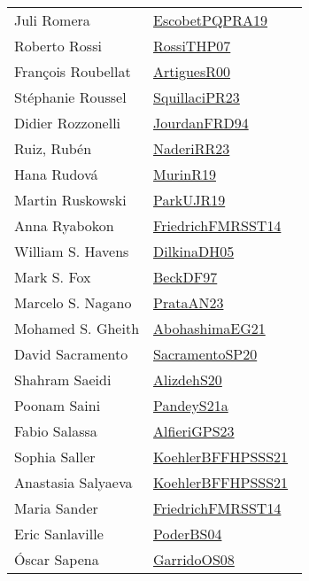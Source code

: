 {\begin{longtable}{p{4cm}p{20cm}}
Juli Romera & \href{works/EscobetPQPRA19.pdf}{EscobetPQPRA19}~\cite{EscobetPQPRA19}\\
Roberto Rossi & \href{works/RossiTHP07.pdf}{RossiTHP07}~\cite{RossiTHP07}\\
Fran{\c{c}}ois Roubellat & \href{works/ArtiguesR00.pdf}{ArtiguesR00}~\cite{ArtiguesR00}\\
St{\'{e}}phanie Roussel & \href{works/SquillaciPR23.pdf}{SquillaciPR23}~\cite{SquillaciPR23}\\
Didier Rozzonelli & \href{}{JourdanFRD94}~\cite{JourdanFRD94}\\
Ruiz, Rub\'{e}n & \href{works/NaderiRR23.pdf}{NaderiRR23}~\cite{NaderiRR23}\\
Hana Rudov{\'{a}} & \href{works/MurinR19.pdf}{MurinR19}~\cite{MurinR19}\\
Martin Ruskowski & \href{works/ParkUJR19.pdf}{ParkUJR19}~\cite{ParkUJR19}\\
Anna Ryabokon & \href{}{FriedrichFMRSST14}~\cite{FriedrichFMRSST14}\\
William S. Havens & \href{works/DilkinaDH05.pdf}{DilkinaDH05}~\cite{DilkinaDH05}\\
Mark S. Fox & \href{works/BeckDF97.pdf}{BeckDF97}~\cite{BeckDF97}\\
Marcelo S. Nagano & \href{works/PrataAN23.pdf}{PrataAN23}~\cite{PrataAN23}\\
Mohamed S. Gheith & \href{works/AbohashimaEG21.pdf}{AbohashimaEG21}~\cite{AbohashimaEG21}\\
David Sacramento & \href{works/SacramentoSP20.pdf}{SacramentoSP20}~\cite{SacramentoSP20}\\
Shahram Saeidi & \href{}{AlizdehS20}~\cite{AlizdehS20}\\
Poonam Saini & \href{works/PandeyS21a.pdf}{PandeyS21a}~\cite{PandeyS21a}\\
Fabio Salassa & \href{works/AlfieriGPS23.pdf}{AlfieriGPS23}~\cite{AlfieriGPS23}\\
Sophia Saller & \href{works/KoehlerBFFHPSSS21.pdf}{KoehlerBFFHPSSS21}~\cite{KoehlerBFFHPSSS21}\\
Anastasia Salyaeva & \href{works/KoehlerBFFHPSSS21.pdf}{KoehlerBFFHPSSS21}~\cite{KoehlerBFFHPSSS21}\\
Maria Sander & \href{}{FriedrichFMRSST14}~\cite{FriedrichFMRSST14}\\
Eric Sanlaville & \href{works/PoderBS04.pdf}{PoderBS04}~\cite{PoderBS04}\\
{\'{O}}scar Sapena & \href{works/GarridoOS08.pdf}{GarridoOS08}~\cite{GarridoOS08}\\

\end{longtable}}
